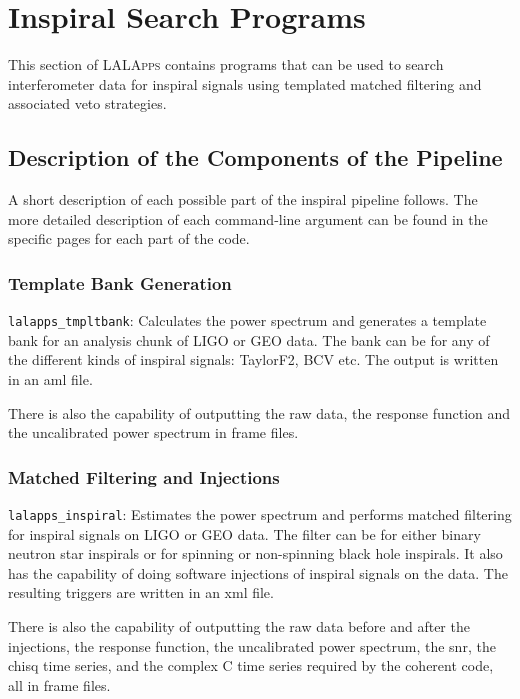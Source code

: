\chapter{Inspiral Search Programs}
\label{chapter:inspiral}

This section of \textsc{LALApps} contains programs that can be used to search
interferometer data for inspiral signals using templated matched filtering and
associated veto strategies.

\section{Description of the Components of the Pipeline}

A short description of each possible part of the inspiral pipeline follows. 
The more detailed description of each command-line argument can be found in 
the specific pages for each part of the code.

\subsection{Template Bank Generation}

\texttt{lalapps\_tmpltbank}: Calculates the power spectrum and generates a 
template bank for an analysis
chunk of LIGO or GEO data. The bank can be for any of the different kinds of
inspiral signals: TaylorF2, BCV etc. The output is written in an aml file.

There is also the capability of outputting the raw data,
the response function and the uncalibrated power spectrum in
frame files.

\subsection{Matched Filtering and Injections}

\texttt{lalapps\_inspiral}: Estimates the power spectrum and performs matched 
filtering for inspiral signals on LIGO or GEO data. The filter can be for
either binary neutron star inspirals or for spinning or non-spinning black 
hole inspirals.
It also has the capability of doing software injections of 
inspiral signals on the data. The resulting triggers are written in an xml
file.

There is also the capability of outputting the raw data before and after the
injections, the response function, the uncalibrated power spectrum, the snr,
the chisq time series, and the complex C time series required by the coherent
code, all in frame files.

